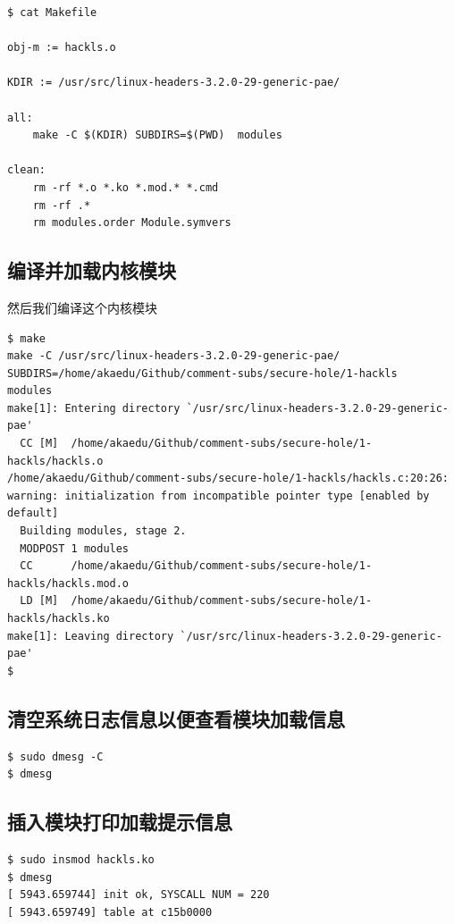 {\begin{shaded}\begin{verbatim}
$ cat Makefile 

obj-m := hackls.o

KDIR := /usr/src/linux-headers-3.2.0-29-generic-pae/

all:
    make -C $(KDIR) SUBDIRS=$(PWD)  modules

clean:
    rm -rf *.o *.ko *.mod.* *.cmd 
    rm -rf .*
    rm modules.order Module.symvers
\end{verbatim}\end{shaded}}
\subsection{编译并加载内核模块}

然后我们编译这个内核模块

{\begin{shaded}\begin{verbatim}
$ make
make -C /usr/src/linux-headers-3.2.0-29-generic-pae/    SUBDIRS=/home/akaedu/Github/comment-subs/secure-hole/1-hackls   modules
make[1]: Entering directory `/usr/src/linux-headers-3.2.0-29-generic-pae'
  CC [M]  /home/akaedu/Github/comment-subs/secure-hole/1-hackls/hackls.o
/home/akaedu/Github/comment-subs/secure-hole/1-hackls/hackls.c:20:26: warning: initialization from incompatible pointer type [enabled by default]
  Building modules, stage 2.
  MODPOST 1 modules
  CC      /home/akaedu/Github/comment-subs/secure-hole/1-hackls/hackls.mod.o
  LD [M]  /home/akaedu/Github/comment-subs/secure-hole/1-hackls/hackls.ko
make[1]: Leaving directory `/usr/src/linux-headers-3.2.0-29-generic-pae'
$ 
\end{verbatim}\end{shaded}}
\subsection{清空系统日志信息以便查看模块加载信息}

{\begin{shaded}\begin{verbatim}
$ sudo dmesg -C
$ dmesg 
\end{verbatim}\end{shaded}}
\subsection{插入模块打印加载提示信息}

{\begin{shaded}\begin{verbatim}
$ sudo insmod hackls.ko
$ dmesg 
[ 5943.659744] init ok, SYSCALL NUM = 220
[ 5943.659749] table at c15b0000
\end{verbatim}\end{shaded}}
